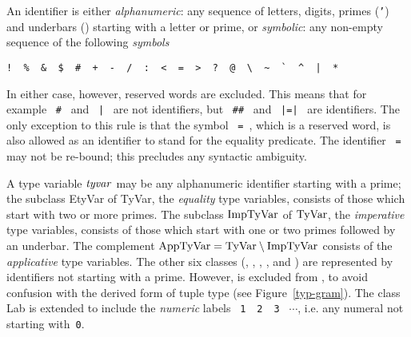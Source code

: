 An identifier is either {\sl alphanumeric}: any sequence of
letters, digits, primes ({\tt '}) and underbars (\wildpat) starting
with a letter or prime, or {\sl symbolic}: any non-empty sequence of the
following {\sl symbols}
\vspace*{-6pt}
\begin{center}
\verb(!  %  &  $  #  +  -  /  :  <  =  >  ?  @  \  ~  `  ^  |  *(
\end{center}
\vspace*{-6pt}
In either case, however, reserved words are excluded.   This means that for
example ~\verb+#+~ and ~{\tt |}~ are not identifiers, but  ~\verb+##+~ and
~{\tt |=|}~ are identifiers.
The only exception to this rule is that the symbol ~{\tt =}~, which is
a reserved word, is also allowed as an identifier to stand for
the equality predicate.
The identifier ~{\tt =}~ may not be re-bound;
this precludes any syntactic ambiguity.

A type variable ${\it tyvar}$\label{etyvar-lab} may be any
alphanumeric identifier starting with a prime; the subclass EtyVar of
TyVar, the {\sl equality} type variables, consists of those which
start with two or more primes.  
The subclass ${\rm ImpTyVar}$ of
${\rm TyVar}$, the {\sl imperative} type variables, consists of those which
start with one or two primes followed by an underbar.  The complement
${\rm AppTyVar}={\rm TyVar}\setminus{\rm ImpTyVar}$ consists of the {\sl
applicative} type variables.  The other six classes ({\Var}, {\Con},
{\Exn}, {\TyCon}, {\Lab} and {\StrId}) are represented by identifiers
not starting with a prime. However, {\tt *} is excluded from {\TyCon},
to avoid confusion with the derived form of tuple type (see
Figure~\ref{typ-gram}). The class Lab is extended to
include the {\em numeric} labels ~{\tt 1}~~{\tt 2}~~{\tt 3}~ $\cdots$,
i.e. any numeral not starting with~{\tt 0}.

